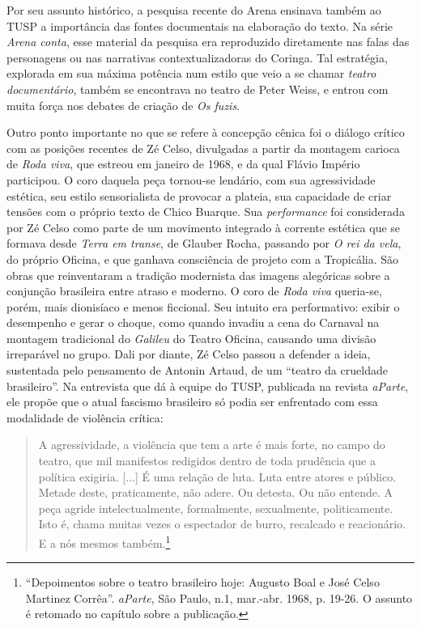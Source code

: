 Por seu assunto histórico, a pesquisa recente do Arena ensinava também
ao TUSP a importância das fontes documentais na elaboração do texto. Na
série \textit{Arena conta}, esse material da pesquisa era reproduzido
diretamente nas falas das personagens ou nas narrativas
contextualizadoras do Coringa. Tal estratégia, explorada em sua máxima
potência num estilo que veio a se chamar \textit{teatro documentário},
também se encontrava no teatro de Peter Weiss, e entrou com muita força
nos debates de criação de \textit{Os fuzis}.

Outro ponto importante no que se refere à concepção cênica foi o diálogo
crítico com as posições recentes de Zé Celso, divulgadas a partir da
montagem carioca de \textit{Roda viva}, que estreou em janeiro de 1968, e
da qual Flávio Império participou. O coro daquela peça tornou-se
lendário, com sua agressividade estética, seu estilo sensorialista de
provocar a plateia, sua capacidade de criar tensões com o próprio texto
de Chico Buarque. Sua \textit{performance} foi considerada por Zé Celso
como parte de um movimento integrado à corrente estética que se formava
desde \textit{Terra em transe}, de Glauber Rocha, passando por \textit{O rei
da vela}, do próprio Oficina, e que ganhava consciência de projeto com a
Tropicália. São obras que reinventaram a tradição modernista das imagens
alegóricas sobre a conjunção brasileira entre atraso e moderno. O coro
de \textit{Roda viva} queria-se, porém, mais dionisíaco e menos ficcional.
Seu intuito era performativo: exibir o desempenho e gerar o choque, como
quando invadiu a cena do Carnaval na montagem tradicional do
\textit{Galileu} do Teatro Oficina, causando uma divisão irreparável no
grupo. Dali por diante, Zé Celso passou a defender a ideia, sustentada
pelo pensamento de Antonin Artaud, de um “teatro da crueldade
brasileiro”. Na entrevista que dá à equipe do TUSP, publicada na revista
\textit{aParte}, ele propõe que o atual fascismo brasileiro só podia ser
enfrentado com essa modalidade de violência crítica:

\begin{quote}
A agressividade, a violência que tem a arte é mais forte, no campo do
teatro, que mil manifestos redigidos dentro de toda prudência que a
política exigiria. {[}...{]} É uma relação de luta. Luta entre atores e
público. Metade deste, praticamente, não adere. Ou detesta. Ou não
entende. A peça agride intelectualmente, formalmente, sexualmente,
politicamente. Isto é, chama muitas vezes o espectador de burro,
recalcado e reacionário. E a nós mesmos também.\footnote{“Depoimentos
  sobre o teatro brasileiro hoje: Augusto Boal e José Celso Martinez
  Corrêa”. \textit{aParte}, São Paulo, n.1, mar.-abr. 1968, p. 19-26. O
  assunto é retomado no capítulo sobre a publicação.}
\end{quote}

